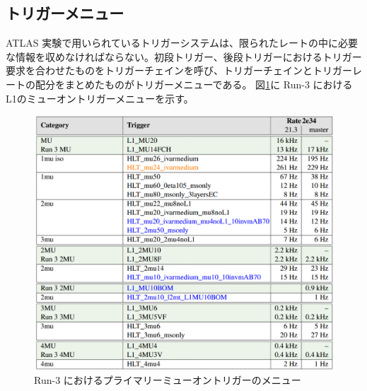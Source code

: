 \subsection{トリガーメニュー}
ATLAS 実験で用いられているトリガーシステムは、限られたレートの中に必要な情報を収めなければならない。初段トリガー、後段トリガーにおけるトリガー要求を合わせたものをトリガーチェインを呼び、トリガーチェインとトリガーレートの配分をまとめたものがトリガーメニューである。
図\ref{fig:muon_trigger_menu.pdf}に Run-3 におけるL1のミューオントリガーメニューを示す。
\begin{figure}[b]
  \centering
  \includegraphics[clip, width=14cm]{fig/2/muon_trigger_menu.pdf}
  \caption{Run-3 におけるプライマリーミューオントリガーのメニュー}
  \label{fig:muon_trigger_menu.pdf}
\end{figure}

